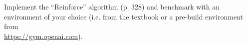 
\begin{exercise}

Implement the \enquote{Reinforce} algorithm (p. 328) and benchmark with an environment of your choice (i.e. from the textbook or a pre-build environment from \\ \href{https://gym.openai.com}{https://gym.openai.com}).

\end{exercise}


\begin{solution}

\phantom{}

\end{solution}

